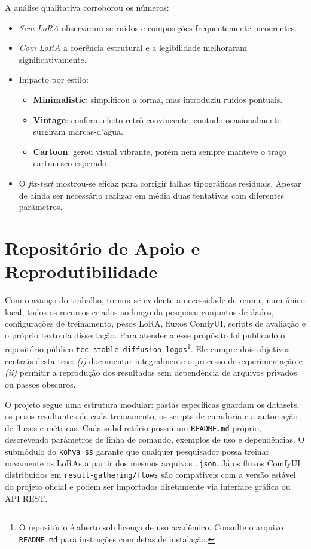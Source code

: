 \documentclass[12pt, %
openright, 
oneside, %
a4paper,    %
brazil]{facom-ufu-abntex2}
\begin{document}
A análise qualitativa corroborou os números:

\begin{itemize}
    \item \emph{Sem LoRA} observaram-se ruídos e composições frequentemente incoerentes.
    \item \emph{Com LoRA} a coerência estrutural e a legibilidade melhoraram significativamente.
    \item Impacto por estilo:
    \begin{itemize}
        \item \textbf{Minimalistic}: simplificou a forma, mas introduziu ruídos pontuais.
        \item \textbf{Vintage}: conferiu efeito retrô convincente, contudo ocasionalmente surgiram marcas-d’água.
        \item \textbf{Cartoon}: gerou visual vibrante, porém nem sempre manteve o traço cartunesco esperado.
    \end{itemize}
    \item O \emph{fix-text} mostrou-se eficaz para corrigir falhas tipográficas residuais. Apesar de ainda ser necessário realizar em média duas tentativas com diferentes parâmetros.
\end{itemize}

\section{Repositório de Apoio e Reprodutibilidade} \label{repo}

Com o avanço do trabalho, tornou-se evidente a necessidade de reunir, num único local, todos os recursos criados ao longo da pesquisa: conjuntos de dados, configurações de treinamento, pesos LoRA, fluxos ComfyUI, scripts de avaliação e o próprio texto da dissertação. Para atender a esse propósito foi publicado o repositório público \href{https://github.com/tornellihenrique/tcc-stable-diffusion-logos}{\texttt{tcc-stable-diffusion-logos}}\footnote{O repositório é aberto sob licença de uso acadêmico. Consulte o arquivo \texttt{README.md} para instruções completas de instalação.}. Ele cumpre dois objetivos centrais desta tese: \emph{(i)} documentar integralmente o processo de experimentação e \emph{(ii)} permitir a reprodução dos resultados sem dependência de arquivos privados ou passos obscuros.

O projeto segue uma estrutura modular: pastas específicas guardam os datasets, os pesos resultantes de cada treinamento, os scripts de curadoria e a automação de fluxos e métricas. Cada subdiretório possui um \texttt{README.md} próprio, descrevendo parâmetros de linha de comando, exemplos de uso e dependências. O submódulo do \texttt{kohya\_ss} garante que qualquer pesquisador possa treinar novamente os LoRAs a partir dos mesmos arquivos \texttt{.json}. Já os fluxos ComfyUI distribuídos em \texttt{result-gathering/flows} são compatíveis com a versão estável do projeto oficial e podem ser importados diretamente via interface gráfica ou API REST.
\end{document}
